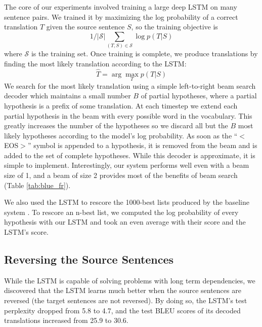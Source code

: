 \documentclass{article} \usepackage{nips14submit_e}
\begin{document}
The core of our experiments involved training a large deep LSTM on
many sentence pairs. We trained it by maximizing the log
probability of a correct translation $T$ given the source sentence
$S$, so the training objective is
$$1/|\mathcal S|\sum_{(T,S)\in\mathcal S}\log p(T|S)$$ where $\mathcal
S$ is the training set.  Once training is complete, we produce
translations by finding the most likely translation according to
the LSTM:
\begin{equation}
\label{eqn:decode}
\hat{T} = \arg\max_T p(T|S)
\end{equation}
We search for the most likely translation using a simple left-to-right
beam search decoder which maintains a small number $B$ of partial
hypotheses, where a partial hypothesis is a prefix of some
translation.  At each timestep we extend each partial hypothesis in
the beam with every possible word in the vocabulary. This greatly
increases the number of the hypotheses so we discard all but the $B$
most likely hypotheses according to the model's log probability.  As soon
as the ``$<$EOS$>$'' symbol is appended to a hypothesis, it is removed from
the beam and is added to the set of complete hypotheses.  While this
decoder is approximate, it is simple to implement.  Interestingly, our
system performs well even with a beam size of 1, and a beam of
size 2 provides most of the benefits of beam search (Table
\ref{tab:blue_fr}).   



We also used the LSTM to rescore the 1000-best lists produced by the
baseline system \cite{wmt14_en_fr}.  To rescore an n-best list, we
computed the log probability of every hypothesis with our LSTM and
took an even average with their score and the LSTM's score.

\subsection{Reversing the Source Sentences}
\label{sec:rev_rev}

While the LSTM is capable of solving problems with long term
dependencies, we discovered that the LSTM learns much better when the
source sentences are reversed (the target sentences are not reversed).  By
doing so, the LSTM's test perplexity dropped from 5.8 to 4.7, and the 
test BLEU scores of its decoded translations increased from 25.9 to 30.6.
\end{document}
